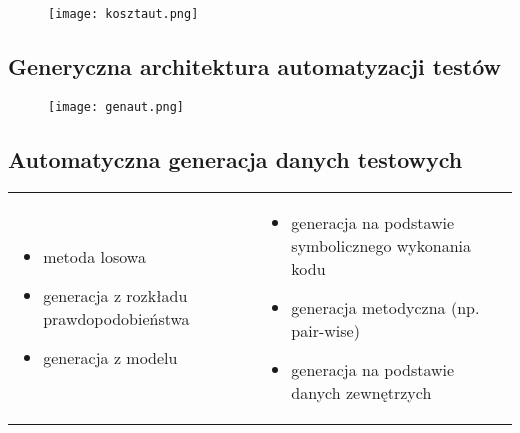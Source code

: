 \documentclass[../main.tex]{subfiles}
\begin{document}
    \begin{figure}[H]
        \texttt{[image: kosztaut.png]}
    \end{figure}

    \subsection{Generyczna architektura automatyzacji testów}
    \begin{figure}[H]
        \texttt{[image: genaut.png]}
    \end{figure}

    \subsection{Automatyczna generacja danych testowych}
    \begin{table}[H]
        \begin{center}
            \begin{tabular}{p{8cm} p{8cm}}
                \begin{itemize}
                    \item metoda losowa
                    \item generacja z rozkładu prawdopodobieństwa
                    \item generacja z modelu
                \end{itemize}
                &
                \begin{itemize}
                    \item generacja na podstawie symbolicznego wykonania kodu
                    \item generacja metodyczna (np. pair-wise)
                    \item generacja na podstawie danych zewnętrzych
                \end{itemize}
            \end{tabular}
        \end{center}
    \end{table}
\end{document}
